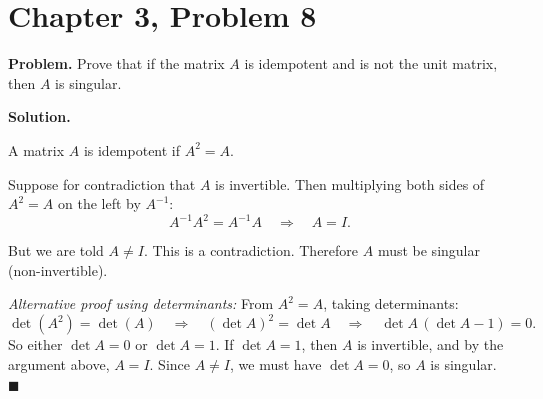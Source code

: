\documentclass[12pt]{article}
\begin{document}
\section*{Chapter 3, Problem 8}

\textbf{Problem.} Prove that if the matrix $A$ is idempotent and is not the unit matrix, then $A$ is singular.

\bigskip
\textbf{Solution.}

A matrix $A$ is idempotent if $A^2 = A$.

Suppose for contradiction that $A$ is invertible. Then multiplying both sides of $A^2 = A$ on the left by $A^{-1}$:
\[
A^{-1} A^2 = A^{-1} A \quad \Longrightarrow \quad A = I.
\]

But we are told $A \neq I$. This is a contradiction. Therefore $A$ must be singular (non-invertible).

\medskip
\textit{Alternative proof using determinants:} From $A^2 = A$, taking determinants:
\[
\det(A^2) = \det(A) \quad \Longrightarrow \quad (\det A)^2 = \det A \quad \Longrightarrow \quad \det A\,(\det A - 1) = 0.
\]
So either $\det A = 0$ or $\det A = 1$. If $\det A = 1$, then $A$ is invertible, and by the argument above, $A = I$. Since $A \neq I$, we must have $\det A = 0$, so $A$ is singular. \hfill $\blacksquare$
\end{document}

